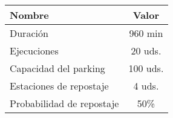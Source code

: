 \documentclass[varwidth=\maxdimen]{standalone}
\begin{document}
\begin{tabular}{ l c }
	\toprule
	Nombre	& Valor	\\
	\midrule
	Duración				& 960	min \\
	Ejecuciones				& 20	uds. \\
	Capacidad del parking	& 100	uds. \\
	Estaciones de repostaje	& 4		uds. \\
	Probabilidad de repostaje		& 50\% \\
	\bottomrule
\end{tabular}
\end{document}
